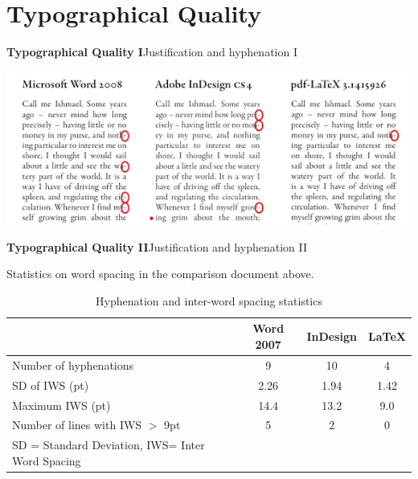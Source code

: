 \documentclass[xcolor=dvipsnames]{beamer}
\begin{document}
\section{Typographical Quality}
\begin{frame}{\textbf{Typographical Quality I}}{Justification and hyphenation I}

\href{http://www.zinktypografie.nl/comparison.pdf}{
\includegraphics[scale=1.2]{fig/fig1}}\centering\\
\vspace{0.3cm}



\end{frame}

\begin{frame}{\textbf{Typographical Quality II}}{Justification and hyphenation II}

Statistics on word spacing in the comparison document above.

\begin{table}

\caption*{Hyphenation and inter-word spacing statistics}
\vspace{-0.6cm}
\begin{tabular}{lccc}
\toprule
& Word 2007 & InDesign & \LaTeX\\
\hline
Number of hyphenations & 9 & 10& 4\\
SD of IWS (pt) & 2.26 & 1.94 & 1.42\\
Maximum IWS (pt) & 14.4 & 13.2 & 9.0\\
Number of lines with IWS $>$ 9pt & 5 & 2 & 0\\
\bottomrule
{\tiny SD = Standard Deviation, IWS= Inter Word Spacing } 
\end{tabular}

\end{table}

\end{frame}
\end{document}
